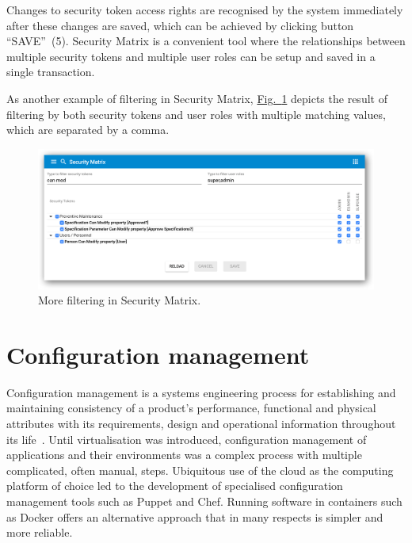 \documentclass[a4paper,12pt,oneside,openright]{memoir}
\begin{document}
	Changes to security token access rights are recognised by the system immediately after these changes are saved, which can be achieved by clicking button ``SAVE''~(5).
	Security Matrix is a convenient tool where the relationships between multiple security tokens and multiple user roles can be setup and saved in a single transaction.

	As another example of filtering in Security Matrix, \hyperref[sec:03_01:fig:6]{Fig.~\ref*{sec:03_01:fig:6}} depicts the result of filtering by both security tokens and user roles with multiple matching values, which are separated by a comma.

	\begin{figure}[h!tbp]
	\centering
	\includegraphics[width=0.9\linewidth]{images/11-security-matrix-filtering-can-modif-and-roles.png}
	\caption{More filtering in Security Matrix.}\label{sec:03_01:fig:6}
	\end{figure}

\section*{Configuration management}\label{sec:04}
	Configuration management is a systems engineering process for establishing and maintaining consistency of a product's performance, functional and physical attributes with its requirements, design and operational information throughout its life~\cite{CM}.
	Until virtualisation was introduced, configuration management of applications and their environments was a complex process with multiple complicated, often manual, steps.
	Ubiquitous use of the cloud as the computing platform of choice led to the development of specialised configuration management tools such as Puppet and Chef.
	Running software in containers such as Docker offers an alternative approach that in many respects is simpler and more reliable.
\end{document}
